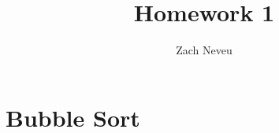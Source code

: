 \documentclass[12pt, letter]{article}
\author{Zach Neveu}
\title{ Homework 1 }
\begin{document}
\maketitle

\section{Bubble Sort}%
\label{sec:bubble_sort}
\end{document}
